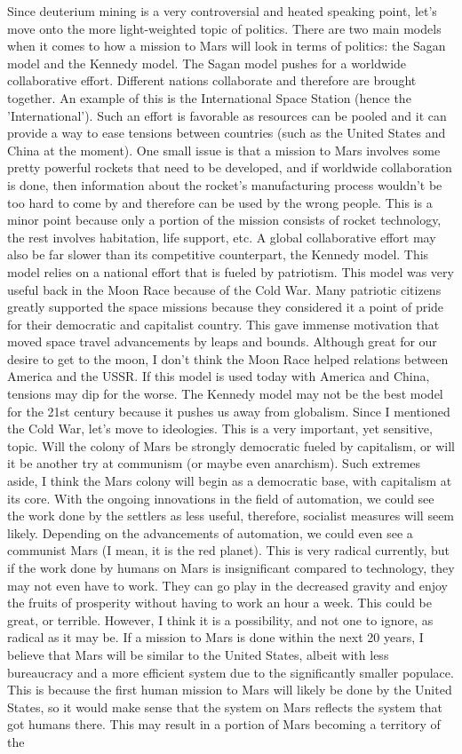 \documentclass[main.tex]{subfiles}
\begin{document}
Since deuterium mining is a very controversial and heated speaking point, let's move onto the more light-weighted topic of politics. There are two main models when it comes to how a mission to Mars will look in terms of politics: the Sagan model and the Kennedy model. The Sagan model pushes for a worldwide collaborative effort. Different nations collaborate and therefore are brought together. An example of this is the International Space Station (hence the 'International'). Such an effort is favorable as resources can be pooled and it can provide a way to ease tensions between countries (such as the United States and China at the moment). One small issue is that a mission to Mars involves some pretty powerful rockets that need to be developed, and if worldwide collaboration is done, then information about the rocket's manufacturing process wouldn't be too hard to come by and therefore can be used by the wrong people. This is a minor point because only a portion of the mission consists of rocket technology, the rest involves habitation, life support, etc. A global collaborative effort may also be far slower than its competitive counterpart, the Kennedy model. This model relies on a national effort that is fueled by patriotism. This model was very useful back in the Moon Race because of the Cold War. Many patriotic citizens greatly supported the space missions because they considered it a point of pride for their democratic and capitalist country. This gave immense motivation that moved space travel advancements by leaps and bounds. Although great for our desire to get to the moon, I don't think the Moon Race helped relations between America and the USSR. If this model is used today with America and China, tensions may dip for the worse. The Kennedy model may not be the best model for the 21st century because it pushes us away from globalism. Since I mentioned the Cold War, let's move to ideologies. This is a very important, yet sensitive, topic. Will the colony of Mars be strongly democratic fueled by capitalism, or will it be another try at communism (or maybe even anarchism). Such extremes aside, I think the Mars colony will begin as a democratic base, with capitalism at its core. With the ongoing innovations in the field of automation, we could see the work done by the settlers as less useful, therefore, socialist measures will seem likely. Depending on the advancements of automation, we could even see a communist Mars (I mean, it is the red planet). This is very radical currently, but if the work done by humans on Mars is insignificant compared to technology, they may not even have to work. They can go play in the decreased gravity and enjoy the fruits of prosperity without having to work an hour a week. This could be great, or terrible. However, I think it is a possibility, and not one to ignore, as radical as it may be. If a mission to Mars is done within the next 20 years, I believe that Mars will be similar to the United States, albeit with less bureaucracy and a more efficient system due to the significantly smaller populace. This is because the first human mission to Mars will likely be done by the United States, so it would make sense that the system on Mars reflects the system that got humans there. This may result in a portion of Mars becoming a territory of the 
\end{document}
